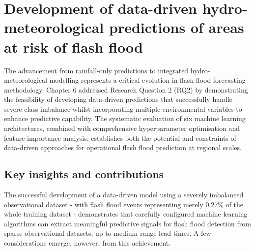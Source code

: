 \section{Development of data-driven hydro-meteorological predictions of areas at risk of flash flood}

The advancement from rainfall-only predictions to integrated hydro-meteorological modelling represents a critical evolution in flash flood forecasting methodology. Chapter 6 addressed Research Question 2 (RQ2) by demonstrating the feasibility of developing data-driven predictions that successfully handle severe class imbalance whilst incorporating multiple environmental variables to enhance predictive capability. The systematic evaluation of six machine learning architectures, combined with comprehensive hyperparameter optimisation and feature importance analysis, establishes both the potential and constraints of data-driven approaches for operational flash flood prediction at regional scales.

\subsection{Key insights and contributions}

The successful development of a data-driven model using a severely imbalanced observational dataset - with flash flood events representing merely 0.27\% of the whole training dataset - demonstrates that carefully configured machine learning algorithms can extract meaningful predictive signals for flash flood detection from sparse observational datasets, up to medium-range lead times. A few considerations emerge, however, from this achievement.

